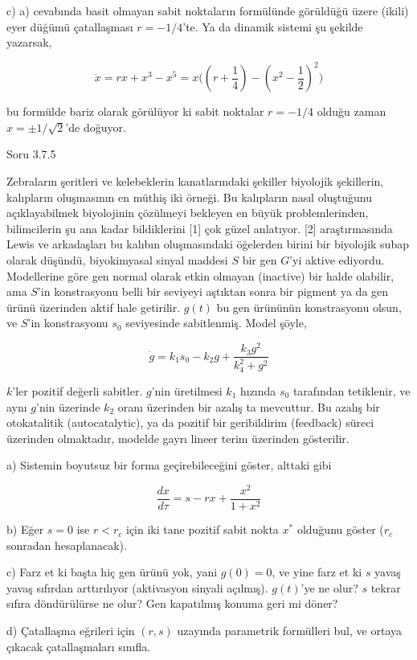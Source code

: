 \documentclass[12pt,fleqn]{article}\usepackage{../../common}
\begin{document}
c) a) cevabında basit olmayan sabit noktaların formülünde görüldüğü üzere
(ikili) eyer düğümü çatallaşması $r=-1/4$'te. Ya da dinamik sistemi şu şekilde
yazarsak,

$$ \dot{x} = rx + x^3 - x^5 = x \bigg( (r+\frac{1}{4}) - (x^2 - \frac{1}{2})^2  \bigg) $$

bu formülde bariz olarak görülüyor ki sabit noktalar $r=-1/4$ olduğu zaman
$x = \pm 1/\sqrt{2}$'de doğuyor. 

Soru 3.7.5

Zebraların şeritleri ve kelebeklerin kanatlarındaki şekiller biyolojik
şekillerin, kalıpların oluşmasının en müthiş iki örneği. Bu kalıpların nasıl
oluştuğunu açıklayabilmek biyolojinin çözülmeyi bekleyen en büyük
problemlerinden, bilimcilerin şu ana kadar bildiklerini [1] çok güzel
anlatıyor. [2] araştırmasında Lewis ve arkadaşları bu kalıbın oluşmasındaki
öğelerden birini bir biyolojik subap olarak düşündü, biyokimyasal sinyal maddesi
$S$ bir gen $G$'yi aktive ediyordu. Modellerine göre gen normal olarak etkin
olmayan (inactive) bir halde olabilir, ama $S$'in konstrasyonu belli bir
seviyeyi aştıktan sonra bir pigment ya da gen ürünü üzerinden aktif hale
getirilir. $g(t)$ bu gen ürününün konstrasyonu olsun, ve $S$'in konstrasyonu
$s_0$ seviyesinde sabitlenmiş. Model şöyle,

$$ \dot{g} = k_1s_0 - k_2g + \frac{k_3 g^2}{k_4^2 + g^2} $$

$k$'ler pozitif değerli sabitler. $g$'nin üretilmesi $k_1$ hızında $s_0$
tarafından tetiklenir, ve aynı $g$'nin üzerinde $k_2$ oranı üzerinden bir azalış
ta mevcuttur. Bu azalış bir otokatalitik (autocatalytic), ya da pozitif bir
geribildirim (feedback) süreci üzerinden olmaktadır, modelde gayrı lineer terim
üzerinden gösterilir.

a) Sistemin boyutsuz bir forma geçirebileceğini göster, alttaki gibi

$$ \frac{dx}{d\tau} = s - rx  + \frac{x^2}{1+x^2} $$

b) Eğer $s=0$ ise $r<r_c$ için iki tane pozitif sabit nokta $x^*$ olduğunu
göster ($r_c$ sonradan hesaplanacak).

c) Farz et ki başta hiç gen ürünü yok, yani $g(0) = 0 $, ve yine farz et ki $s$
yavaş yavaş sıfırdan arttırılıyor (aktivasyon sinyali açılmış). $g(t)$'ye ne
olur? $s$ tekrar sıfıra döndürülürse ne olur? Gen kapatılmış konuma geri mi
döner?

d) Çatallaşma eğrileri için $(r,s)$ uzayında parametrik formülleri bul, ve
ortaya çıkacak çatallaşmaları sınıfla.
\end{document}
